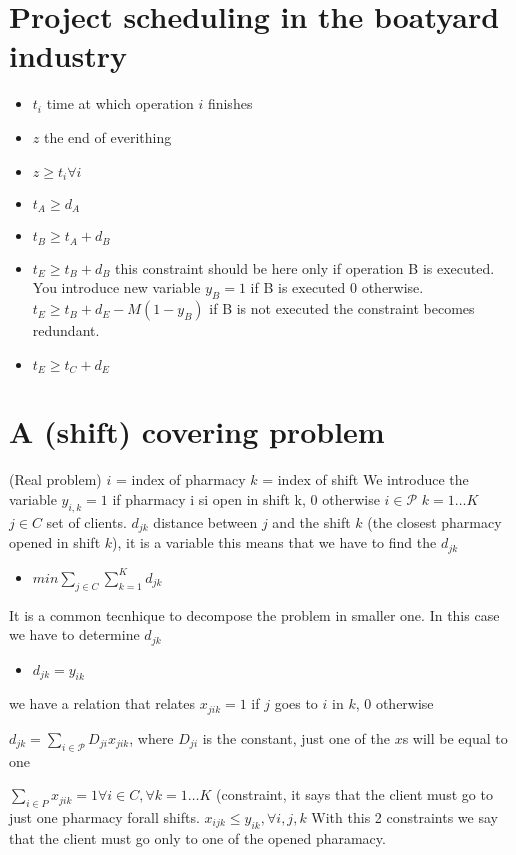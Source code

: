\documentclass{scrartcl}
\begin{document}
	\section{Project scheduling in the boatyard industry}
	\begin{itemize}
	\item $t_i$ time at which operation $i$ finishes
	\item $z$ the end of everithing
	\item $z \geq t_i \forall i$	
	\item $t_A \geq d_A$
	\item $t_B \geq t_A + d_B$	
	\item $ t_E \geq t_B + d_B$ this constraint should be here only if operation B is executed. You
	introduce new variable $y_B = 1$ if B is executed $0$ otherwise. 
	$t_E \geq t_B + d_E -M(1-y_B)$
	if B is not executed the constraint becomes redundant.
	\item $t_E \geq t_C + d_E$
	\end{itemize}
	\section{A (shift) covering problem}
	(Real problem)
	$i$ = index of pharmacy
	$k$ = index of shift
	We introduce the variable
$y_{i,k} = 1$ if pharmacy i si open in shift k, 0 otherwise
$i \in \mathcal{P}$ $k = 1\dots K $
$j \in C$ set of clients.
$d_{jk}$ distance between $j$ and the shift $k$ (the closest pharmacy opened in shift $k$), it is a variable
this means that we have to find the $d_{jk}$

\begin{itemize}
\item $min \sum_{j \in C}^{} \sum_{k = 1}^{K} d_{jk} $
\end{itemize}
It is a common tecnhique to decompose the problem in smaller one.
In this case we have to determine $d_{jk}$
\begin{itemize}
\item $d_{jk} = y_{ik}$
\end{itemize}
we have a relation that relates $x_{jik} = 1 $ if $j$ goes to $i$ in $k$, $0$ otherwise


$d_{jk} = \sum_{i\in \mathcal{P}} D_{ji} x_{jik}$, where $D_{ji}$ is the constant, just
	one of the $x$s will be equal to one
	
$\sum_{i \in P} x_{jik} = 1 \forall i \in C, \forall k = 1\dots K$ (constraint, it says that
the client must go to just one pharmacy forall shifts.
$x_{ijk} \leq y_{ik}, \forall i,j,k$
With this 2 constraints we say that the client must go only to one of the opened pharamacy.
\end{document}
